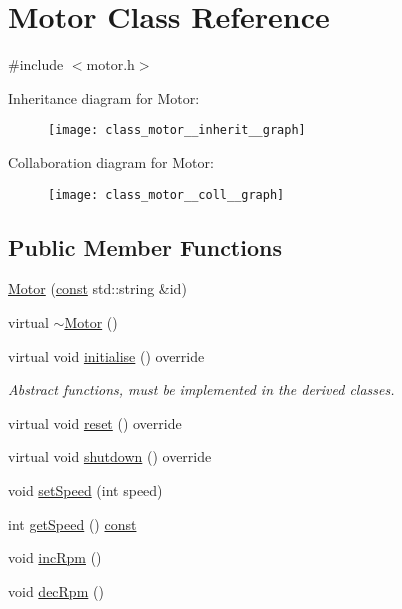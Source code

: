 \hypertarget{class_motor}{}\section{Motor Class Reference}
\label{class_motor}


{\ttfamily \#include $<$motor.\+h$>$}



Inheritance diagram for Motor\+:\nopagebreak
\begin{figure}[H]
\begin{center}
\leavevmode
\texttt{[image: class\_motor\_\_inherit\_\_graph]}
\end{center}
\end{figure}


Collaboration diagram for Motor\+:\nopagebreak
\begin{figure}[H]
\begin{center}
\leavevmode
\texttt{[image: class\_motor\_\_coll\_\_graph]}
\end{center}
\end{figure}
\subsection*{Public Member Functions}
\begin{DoxyCompactItemize}
\item 
\hyperlink{class_motor_aade6af850e0177846336ddd136b1f2c9}{Motor} (\hyperlink{functions__c_8js_afacfd9c985d225bb07483b887a801b6f}{const} std\+::string \&id)
\item 
virtual \hyperlink{class_motor_a3135cf1bc9a3c68e1db0214c00a2b50f}{$\sim$\+Motor} ()
\item 
virtual void \hyperlink{class_motor_a7b47a09309764fdaeb8d6e6b2cac5c07}{initialise} () override
\begin{DoxyCompactList}\small\item\em Abstract functions, must be implemented in the derived classes. \end{DoxyCompactList}\item 
virtual void \hyperlink{class_motor_a0d0d43531b4b8b9d37fb8f936dd0f53c}{reset} () override
\item 
virtual void \hyperlink{class_motor_a8ef8df58afeba551f02b8e4afbd23c50}{shutdown} () override
\item 
void \hyperlink{class_motor_aa58cbc26a0da87389dd208367d0fa407}{set\+Speed} (int speed)
\item 
int \hyperlink{class_motor_adb1bb79029d707698d255fb3ce0e06f3}{get\+Speed} () \hyperlink{functions__c_8js_afacfd9c985d225bb07483b887a801b6f}{const} 
\item 
void \hyperlink{class_motor_a93a4de89dd6f493c165137a78e3d97b4}{inc\+Rpm} ()
\item 
void \hyperlink{class_motor_ac271f30175d294a9d27d50193840d61e}{dec\+Rpm} ()
\end{DoxyCompactItemize}


